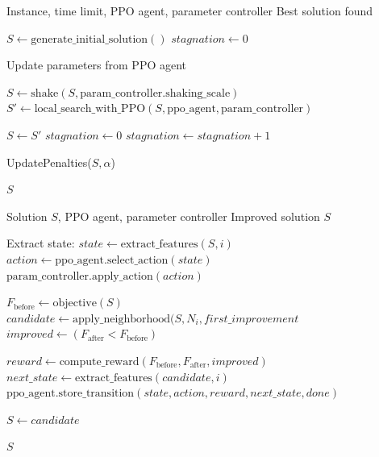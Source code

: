 \documentclass{article}
\begin{document}
\begin{algorithm}[H]
\caption{GVNS with PPO-Driven Local Search}
\begin{algorithmic}[1]
\Require Instance, time limit, PPO agent, parameter controller
\Ensure Best solution found

\State $S \gets \text{generate\_initial\_solution}()$
\State $stagnation \gets 0$

    \State Update parameters from PPO agent
    \State \phantom{}

    \State $S \gets \text{shake}(S, \text{param\_controller.shaking\_scale})$ 
    \State $S' \gets \text{local\_search\_with\_PPO}(S, \text{ppo\_agent}, \text{param\_controller})$

    \State \phantom{}
        \State $S \gets S'$
        \State $stagnation \gets 0$
    \Else
        \State $stagnation \gets stagnation + 1$
    \EndIf

    \State \phantom{}
    \State UpdatePenalties($S, \alpha$)

\EndWhile

\State \Return $S$
\end{algorithmic}
\end{algorithm}

\begin{algorithm}[H]
\caption{Local Search with PPO}
\begin{algorithmic}[1]
\Require Solution $S$, PPO agent, parameter controller
\Ensure Improved solution $S$

    \State Extract state: $state \gets \text{extract\_features}(S, i)$
    \State $action \gets \text{ppo\_agent.select\_action}(state)$
    \State $\text{param\_controller.apply\_action}(action)$
    \State \phantom{}

    \State $F_{\text{before}} \gets \text{objective}(S)$
    \State $candidate \gets \text{apply\_neighborhood}(S, N_i, first\_improvement$
    \State $improved \gets (F_{\text{after}} < F_{\text{before}})$

    \State \phantom{}
    \State $reward \gets \text{compute\_reward}(F_{\text{before}}, F_{\text{after}}, improved)$
    \State $next\_state \gets \text{extract\_features}(candidate, i)$
    \State $\text{ppo\_agent.store\_transition}(state, action, reward, next\_state, done)$ 

    \State \phantom{}
        \State $S \gets candidate$
    \EndIf
\EndFor

\State \Return $S$
\end{algorithmic}
\end{algorithm}
\end{document}
